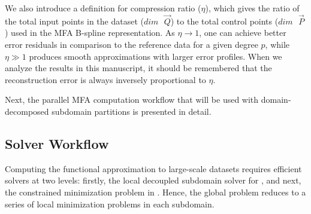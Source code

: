 We also introduce a definition for compression ratio ($\eta$), which gives the ratio of the total input points in the dataset ($dim\text{ }\vec{Q}$) to the total control points ($dim\text{ }\vec{P}$) used in the MFA B-spline representation. As $\eta \rightarrow 1$, one can achieve better error residuals in comparison to the reference data for a given degree $p$, while $\eta \gg 1$ produces smooth approximations with larger error profiles. When we analyze the results in this manuscript, it should be remembered that the reconstruction error is always inversely proportional to $\eta$.

Next, the parallel MFA computation workflow that will be used with domain-decomposed subdomain partitions is presented in detail. 

\subsection{Solver Workflow}
\label{sec:solver-methodology}

Computing the functional approximation to large-scale datasets requires efficient solvers at two levels: firstly, the local decoupled subdomain solver for  , and next, the constrained minimization problem in . Hence, the global problem reduces to a series of local minimization problems in each subdomain.

